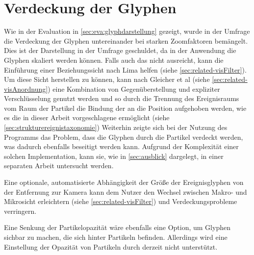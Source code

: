 \section{Verdeckung der Glyphen}
Wie in der Evaluation in \autoref{sec:eva:glyphdarstellung} gezeigt, wurde in der Umfrage die Verdeckung der Glyphen untereinander bei starken Zoomfaktoren bemängelt. Dies ist der Darstellung in der Umfrage geschuldet, da in der Anwendung die Glyphen skaliert werden können. Falls auch das nicht ausreicht, kann die Einführung einer Beziehungssicht nach Lima helfen (siehe \autoref{sec:related-visFilter}). Um diese Sicht herstellen zu können, kann nach Gleicher et al (siehe \autoref{sec:related-visAnordnung}) eine Kombination von Gegenüberstellung und expliziter Verschlüsselung genutzt werden und so durch die Trennung des Ereignisraums vom Raum der Partikel die Bindung der  an die Position aufgehoben werden, wie es die in dieser Arbeit vorgeschlagene  ermöglicht (siehe \autoref{sec:strukturereignistaxonomie})
Weiterhin zeigte sich bei der Nutzung des Programms das Problem, dass die Glyphen durch die Partikel verdeckt werden, was dadurch ebenfalls beseitigt werden kann.
Aufgrund der Komplexität einer solchen Implementation, kann sie, wie in \autoref{sec:ausblick} dargelegt, in einer separaten Arbeit untersucht werden. %

Eine optionale, automatisierte Abhängigkeit der Größe der Ereignisglyphen von der Entfernung zur Kamera kann dem Nutzer den Wechsel zwischen Makro- und Mikrosicht erleichtern (siehe \autoref{sec:related-visFilter}) und Verdeckungsprobleme verringern.
	
Eine Senkung der Partikelopazität wäre ebenfalls eine Option, um Glyphen sichbar zu machen, die sich hinter Partikeln befinden. Allerdings wird eine Einstellung der Opazität von Partikeln durch  derzeit nicht unterstützt.


